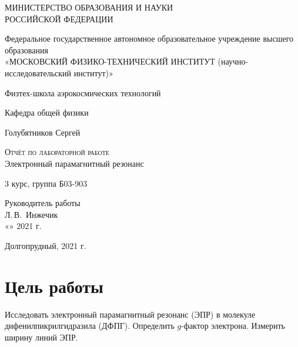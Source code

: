 \documentclass[14pt,a4paper]{scrartcl}
\begin{document}
\begin{titlepage}
  \begin{center}
    \large
    МИНИСТЕРСТВО ОБРАЗОВАНИЯ И НАУКИ\\ РОССИЙСКОЙ ФЕДЕРАЦИИ
     
    \vspace{0.5cm}
 
    Федеральное государственное автономное образовательное учреждение высшего образования \\ «МОСКОВСКИЙ ФИЗИКО-ТЕХНИЧЕСКИЙ ИНСТИТУТ (научно-исследовательский институт)»
    \vspace{0.25cm}

	Физтех-школа аэрокосмических технологий
     
    Кафедра общей физики
    \vfill
     
     

    Голубятников Сергей
    \vfill
 
    \textsc{Отчёт по лабораторной работе}\\[5mm]
     
    {\LARGE Электронный парамагнитный резонанс}
  \bigskip
     
   3 курс, группа Б03-903
\end{center}
\vfill
 
\newlength{\ML}
\hfill
\begin{minipage}{0.4\textwidth}
  Руководитель работы\\
  \underline{\hspace{\ML}} Л.\,В.~Инжечик\\
  «\underline{\hspace{0.7cm}}» \underline{\hspace{2cm}} 2021 г.
\end{minipage}%
\bigskip
 

\vfill
 
\begin{center}
  Долгопрудный, 2021 г.
\end{center}
\end{titlepage}


\tableofcontents
{}
\newpage


\section{Цель работы}
Исследовать электронный парамагнитный резонанс (ЭПР) в молекуле дифенилпикрилгидразила (ДФПГ). Определить $g$-фактор электрона. Измерить ширину линий ЭПР.
\end{document}
